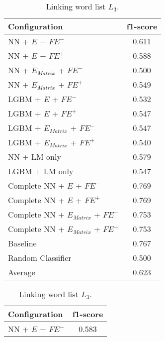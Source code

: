 \begin{table}[h]
  	\tiny
  	\centering
	\begin{subtable}{.5\textwidth}
		\centering
  		\renewcommand{\arraystretch}{1.4}
   		\begin{tabular}{|| l || c ||}
   			\hline
   			{Configuration} & {f1-score} \\
   			\hline\hline
   			NN + $E$ + $\textit{FE}^-$ &  0.611 \\
 			\hline
 			NN + $E$ + $\textit{FE}^+$ & 0.588 \\
 			\hline
 			NN + $E_{Matrix}$ + $\textit{FE}^-$ & 0.500 \\
 			\hline
 			NN + $E_{Matrix}$ + $\textit{FE}^+$ & 0.549 \\
 			\hline
 			LGBM + $E$ + $\textit{FE}^-$ & 0.532 \\
 			\hline
 			LGBM + $E$ + $\textit{FE}^+$ & 0.547 \\
 			\hline
 			LGBM + $E_{Matrix}$ + $\textit{FE}^-$ & 0.547 \\
 			\hline
 			LGBM + $E_{Matrix}$ + $\textit{FE}^+$ & 0.540 \\
 			\hline
 			NN + LM only & 0.579 \\
 			\hline
 			LGBM + LM only & 0.547 \\
 			\hline
 			Complete NN + $E$ + $\textit{FE}^-$ & 0.769 \\
 			\hline
 			Complete NN + $E$ + $\textit{FE}^+$ & 0.769 \\
 			\hline
 			Complete NN + $E_{Matrix}$ + $\textit{FE}^-$ & 0.753 \\
 			\hline
 			Complete NN + $E_{Matrix}$ + $\textit{FE}^+$ & 0.753 \\
 			\hline
 			Baseline & 0.767 \\
 			\hline
 			Random Classifier & 0.500 \\
 			\hline
 			\hline
 			Average & 0.623 \\
 			\hline
		\end{tabular}
		\renewcommand{\arraystretch}{1}
  		\caption{Linking word list $L_3$.}%
  	\end{subtable}%
  	\begin{subtable}{.5\textwidth}
		\centering
  		\renewcommand{\arraystretch}{1.4}
   		\begin{tabular}{|| l || c ||}
   			\hline
   			{Configuration} & {f1-score} \\
   			\hline\hline
   			NN + $E$ + $\textit{FE}^-$ &  0.583 \\
 			\hline

\end{tabular}
\end{subtable}
\end{table}
